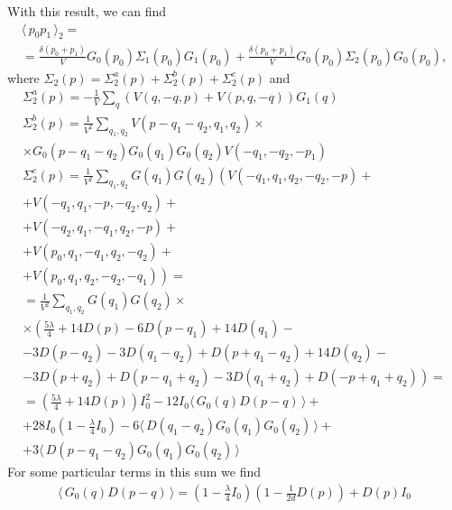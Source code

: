 \documentclass[12pt]{article}
\newcommand{\lr}[1]{ \left( #1 \right) }
\newcommand{\vev}[1]{ \langle \, #1 \, \rangle }
\begin{document}
With this result, we can find
\begin{eqnarray}
\label{G2_2}
 \vev{p_0 p_1}_2
 = \nonumber \\ =
 \frac{\delta\lr{p_0 + p_1}}{V} G_0\lr{p_0} \Sigma_1\lr{p_0} G_1\lr{p_0}
 +
 \frac{\delta\lr{p_0 + p_1}}{V} G_0\lr{p_0} \Sigma_2\lr{p_0} G_0\lr{p_0}
 ,
\end{eqnarray}
where $\Sigma_2\lr{p} = \Sigma_2^a\lr{p} + \Sigma_2^b\lr{p} + \Sigma_2^c\lr{p}$ and
\begin{eqnarray}
\label{sigma2_a}
 \Sigma_2^a\lr{p} = - \frac{1}{V} \sum\limits_q \lr{V\lr{q, -q, p} + V\lr{p, q, -q}} G_1\lr{q}
\\
\label{sigma2_b}
 \Sigma_2^b\lr{p} = \frac{1}{V^2} \sum\limits_{q_1, q_2}
 V\lr{p - q_1 - q_2, q_1, q_2}
 \times \nonumber \\ \times
 G_0\lr{p - q_1 - q_2} G_0\lr{q_1} G_0\lr{q_2}
 V\lr{-q_1, -q_2, -p_1}
\\
\label{sigma2_c}
 \Sigma_2^c\lr{p} = \frac{1}{V^2} \sum\limits_{q_1, q_2}
 G\lr{q_1} G\lr{q_2}
 \left(
  V\lr{-q_1, q_1, q_2, -q_2, -p}
  + \right. \nonumber \\ +
  V\lr{-q_1, q_1, -p, -q_2, q_2}
  + \nonumber \\ +
  V\lr{-q_2, q_1, -q_1, q_2, -p}
  + \nonumber \\ +
  V\lr{p_0, q_1, -q_1, q_2, -q_2}
  + \nonumber \\ \left. +
  V\lr{p_0, q_1, q_2, -q_2, -q_1}
 \right)
 = \nonumber \\ =
 \frac{1}{V^2} \sum\limits_{q_1, q_2}
 G\lr{q_1} G\lr{q_2}
 \times \nonumber \\ \times
 \left(
 \frac{5 \lambda }{4}
 +14 D\lr{p}
  -6 D\lr{p-q_1}
  +14 D\lr{q_1}
 - \right. \nonumber \\ -
 3 D\lr{p-q_2}
 - 3 D\lr{q_1-q_2}
  + D\lr{p+q_1-q_2}
  +14 D\lr{q_2}
  - \nonumber \\ \left. -
  3 D\lr{p+q_2}
  +D\lr{p-q_1+q_2}
  -3 D\lr{q_1+q_2}
   +D\lr{-p+q_1+q_2}
 \right)
 = \nonumber \\ =
 \lr{\frac{5 \lambda}{4} + 14 D\lr{p}} I_0^2
 - 12 I_0 \vev{G_0\lr{q} D\lr{p - q}}
 + \nonumber \\ +
 28 I_0 \lr{1 - \frac{\lambda}{4} I_0}
 - 6 \vev{D\lr{q_1 - q_2} G_0\lr{q_1} G_0\lr{q_2}}
 + \nonumber \\ +
  3 \vev{D\lr{p - q_1 - q_2} G_0\lr{q_1} G_0\lr{q_2}} 
\end{eqnarray}
For some particular terms in this sum we find
\begin{eqnarray}
\label{s2c_term1}
 \vev{G_0\lr{q} D\lr{p - q}} = \lr{1 - \frac{\lambda}{4} I_0} \lr{1 - \frac{1}{2 d} D\lr{p}}
 + D\lr{p} I_0
\end{eqnarray}
\end{document}
